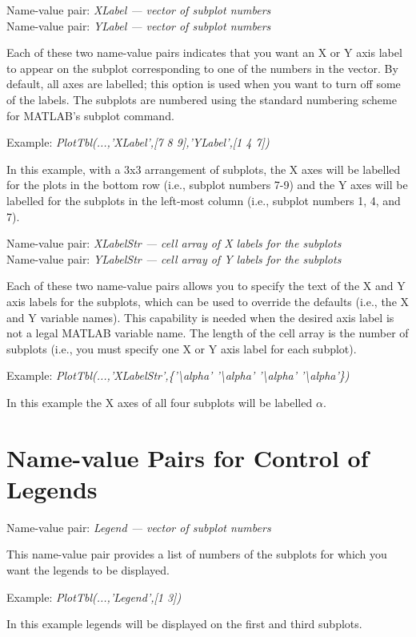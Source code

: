 \documentclass{article}
\newcommand{\example}[1]{Example: {\it #1}}
\newcommand{\namevalue}[2]{{\it #1 --- #2}}
\begin{document}
Name-value pair: \namevalue{XLabel}{vector of subplot numbers} \\
Name-value pair: \namevalue{YLabel}{vector of subplot numbers}

Each of these two name-value pairs indicates that you want an X or Y axis label to appear
on the subplot corresponding to one of the numbers in the vector.
By default, all axes are labelled; this option is used when you want to turn off
some of the labels.
The subplots are numbered using the standard numbering scheme for MATLAB's subplot command.

\example{PlotTbl(...,'XLabel',[7 8 9],'YLabel',[1 4 7])}

In this example, with a 3x3 arrangement of subplots, the X axes will
be labelled for the plots in the bottom row (i.e., subplot numbers 7-9) and the Y axes
will be labelled for the subplots in the left-most column (i.e., subplot numbers 1, 4, and 7).

Name-value pair: \namevalue{XLabelStr}{cell array of X labels for the subplots} \\
Name-value pair: \namevalue{YLabelStr}{cell array of Y labels for the subplots}

Each of these two name-value pairs allows you to specify the text of the X and Y axis labels for the
subplots, which can be used to override the defaults (i.e., the X and Y variable names).
This capability is needed when the desired axis label is not a legal MATLAB variable name.
The length of the cell array is the number of subplots (i.e., you must specify
one X or Y axis label for each subplot).

\example{PlotTbl(...,'XLabelStr',\{'\textbackslash alpha' '\textbackslash alpha' '\textbackslash alpha' '\textbackslash alpha'\})}

In this example the X axes of all four subplots will be labelled $\alpha$.

\section{Name-value Pairs for Control of Legends}

Name-value pair: \namevalue{Legend}{vector of subplot numbers}

This name-value pair provides a list of numbers of the subplots for which you want the legends to be displayed.

\example{PlotTbl(...,'Legend',[1 3])}

In this example legends will be displayed on the first and third subplots.
\end{document}
